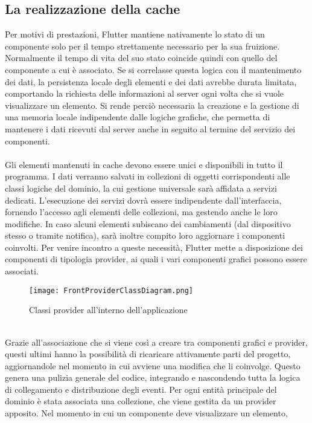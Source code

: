 \subsection{La realizzazione della cache}
Per motivi di prestazioni,
Flutter mantiene nativamente lo stato di un componente 
solo per il tempo strettamente necessario per la sua fruizione. 
Normalmente il tempo di vita del suo stato coincide quindi 
con quello del componente a cui è associato. 
Se si correlasse questa logica con il mantenimento dei dati,
la persistenza locale degli elementi e dei dati avrebbe durata limitata,
comportando la richiesta delle informazioni al server 
ogni volta che si vuole visualizzare un elemento. 
Si rende perciò necessaria la creazione e la gestione di una memoria locale 
indipendente dalle logiche grafiche,
che permetta di mantenere i dati ricevuti dal server 
anche in seguito al termine del servizio dei componenti.\\
\\
Gli elementi mantenuti in cache devono essere unici e disponibili in tutto il programma.
I dati verranno salvati in collezioni di oggetti corrispondenti alle classi logiche del dominio, 
la cui gestione universale sarà affidata a servizi dedicati. 
L'esecuzione dei servizi dovrà essere indipendente dall'interfaccia,
fornendo l'accesso agli elementi delle collezioni,
ma gestendo anche le loro modifiche.
In caso alcuni elementi subiscano dei cambiamenti (dal dispositivo stesso o tramite notifica), 
sarà inoltre compito loro aggiornare i componenti coinvolti.
Per venire incontro a queste necessità, 
Flutter mette a disposizione dei componenti di tipologia provider,
ai quali i vari componenti grafici possono essere associati.\\
\begin{figure}[h!]
    \centering
    \texttt{[image: FrontProviderClassDiagram.png]}
    \caption{Classi provider all'interno dell'applicazione}
\end{figure}	
\\
Grazie all'associazione che si viene così a creare tra componenti grafici e provider,
questi ultimi hanno la possibilità di ricaricare attivamente parti del progetto, 
aggiornandole nel momento in cui avviene una modifica che li coinvolge.
Questo genera una pulizia generale del codice,
integrando e nascondendo tutta la logica di collegamento e distribuzione degli eventi.
Per ogni entità principale del dominio è stata associata una collezione,
che viene gestita da un provider apposito.
Nel momento in cui un componente deve visualizzare un elemento,
